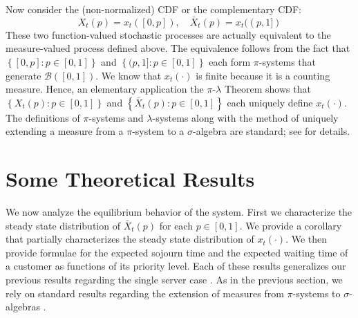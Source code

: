 \documentclass[conference]{IEEEtran}
\newcommand{\Bcal}{\mathcal{B}}
\newcommand{\set}[1]{\left\{#1\right\}}
\begin{document}
Now consider the (non-normalized) CDF or the complementary CDF:
\begin{equation}
  X_t(p) = x_t([0, p]),\quad \bar X_t(p) = x_t((p, 1])
\end{equation}
These two function-valued stochastic processes are actually equivalent
to the measure-valued process defined above. The equivalence follows
from the fact that $\set{[0, p] : p \in [0, 1]}$ and $\set{(p, 1] : p
  \in [0, 1]}$ each form $\pi$-systems that generate
$\Bcal([0,1])$. We know that $x_t(\cdot)$ is finite because it is a
counting measure.  Hence, an elementary application the
$\pi$-$\lambda$ Theorem shows that $\set{X_t(p) : p \in [0, 1]}$ and
$\set{\bar X_t(p) : p \in [0,1]}$ each uniquely define
$x_t(\cdot)$. The definitions of $\pi$-systems and $\lambda$-systems
along with the method of uniquely extending a measure from a
$\pi$-system to a $\sigma$-algebra are standard; see
\cite[Chapter~3]{Billingsley} for details.

\section{Some Theoretical Results\label{sec:theory}}
We now analyze the equilibrium behavior of the system. First we
characterize the steady state distribution of $\bar X_t(p)$ for each
$p \in [0, 1]$. We provide a corollary that partially characterizes
the steady state distribution of $x_t(\cdot)$. We then provide
formulae for the expected sojourn time and the expected waiting time
of a customer as functions of its priority level. Each of these
results generalizes our previous results regarding the single server
case \cite{Master_ACC_2017}. As in the previous section, we rely on
standard results regarding the extension of measures from
$\pi$-systems to $\sigma$-algebras \cite[Chapter~3]{Billingsley}.
\end{document}
